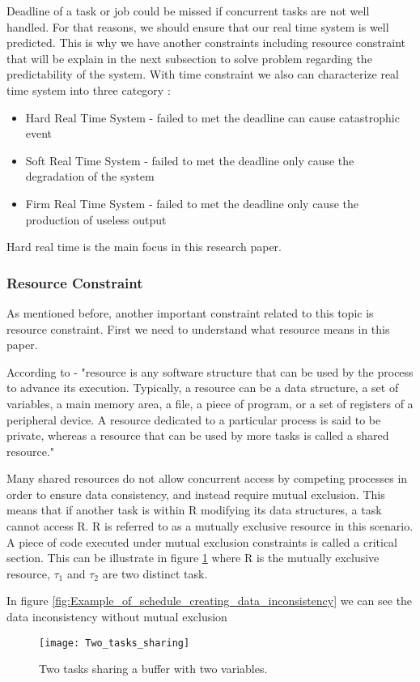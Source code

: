 Deadline of a task or job could be missed if concurrent tasks are not well handled. For that reasons, we should ensure that our real time system is well predicted. This is why we have another constraints including resource constraint that will be explain in the next subsection to solve problem regarding the predictability of the system. With time constraint we also can characterize real time system into three category :
\begin{itemize}
\item Hard Real Time System - failed to met the deadline can cause catastrophic event 
\item Soft Real Time System - failed to met the deadline only cause the degradation of the system 
\item Firm Real Time System - failed to met the deadline only cause the production of useless output 
\end{itemize}

Hard real time is the main focus in this research paper.
\subsubsection{Resource Constraint}

As mentioned before, another important constraint related to this topic is resource constraint. First we need to understand what resource means in this paper.

According to \cite{b5} - "resource is any software structure that can be used by the process to advance its execution. Typically, a resource can be a data structure, a set of variables, a main memory area, a file, a piece of program, or a set of registers of a peripheral device. A resource dedicated to a particular process is said to be private, whereas a resource that can be used by more tasks is called a shared resource."

Many shared resources do not allow concurrent access by competing processes in order to ensure data consistency, and instead require mutual exclusion. This means that if another task is within R modifying its data structures, a task cannot access R. R is referred to as a mutually exclusive resource in this scenario.  A piece of code executed under mutual exclusion constraints is called a critical section. This can be illustrate in figure \ref{fig:Two_tasks_sharing} where R is the mutually exclusive resource, $ \tau_{1} $ and $\tau_{2} $ are two distinct task.

In figure \ref{fig:Example_of_schedule_creating_data_inconsistency} we can see the data inconsistency without mutual exclusion
\begin{figure}[h]
    \centering
    \texttt{[image: Two\_tasks\_sharing]}
    \caption{ Two tasks sharing a buffer with two variables. \cite{b5}}
    \label{fig:Two_tasks_sharing}
\end{figure}

